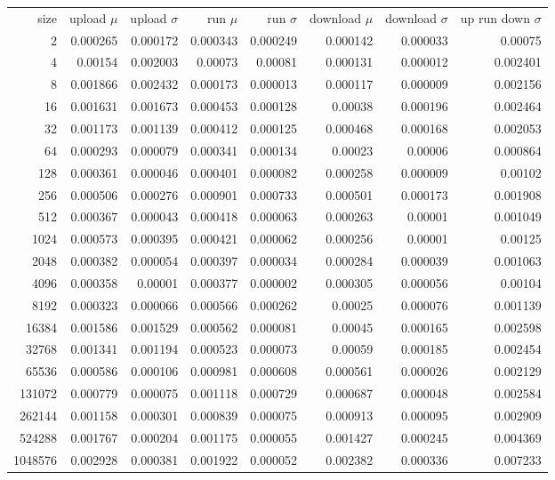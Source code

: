 \begin{tabular}{r r r r r r r r}
size & upload $\mu$  & upload $\sigma$ & run $\mu$ & run $\sigma$ & download $\mu$ & download $\sigma$ & up run down $\sigma$ \\
2 & 0.000265 & 0.000172 & 0.000343 & 0.000249 & 0.000142 & 0.000033 & 0.00075 \\
4 & 0.00154 & 0.002003 & 0.00073 & 0.00081 & 0.000131 & 0.000012 & 0.002401 \\
8 & 0.001866 & 0.002432 & 0.000173 & 0.000013 & 0.000117 & 0.000009 & 0.002156 \\
16 & 0.001631 & 0.001673 & 0.000453 & 0.000128 & 0.00038 & 0.000196 & 0.002464 \\
32 & 0.001173 & 0.001139 & 0.000412 & 0.000125 & 0.000468 & 0.000168 & 0.002053 \\
64 & 0.000293 & 0.000079 & 0.000341 & 0.000134 & 0.00023 & 0.00006 & 0.000864 \\
128 & 0.000361 & 0.000046 & 0.000401 & 0.000082 & 0.000258 & 0.000009 & 0.00102 \\
256 & 0.000506 & 0.000276 & 0.000901 & 0.000733 & 0.000501 & 0.000173 & 0.001908 \\
512 & 0.000367 & 0.000043 & 0.000418 & 0.000063 & 0.000263 & 0.00001 & 0.001049 \\
1024 & 0.000573 & 0.000395 & 0.000421 & 0.000062 & 0.000256 & 0.00001 & 0.00125 \\
2048 & 0.000382 & 0.000054 & 0.000397 & 0.000034 & 0.000284 & 0.000039 & 0.001063 \\
4096 & 0.000358 & 0.00001 & 0.000377 & 0.000002 & 0.000305 & 0.000056 & 0.00104 \\
8192 & 0.000323 & 0.000066 & 0.000566 & 0.000262 & 0.00025 & 0.000076 & 0.001139 \\
16384 & 0.001586 & 0.001529 & 0.000562 & 0.000081 & 0.00045 & 0.000165 & 0.002598 \\
32768 & 0.001341 & 0.001194 & 0.000523 & 0.000073 & 0.00059 & 0.000185 & 0.002454 \\
65536 & 0.000586 & 0.000106 & 0.000981 & 0.000608 & 0.000561 & 0.000026 & 0.002129 \\
131072 & 0.000779 & 0.000075 & 0.001118 & 0.000729 & 0.000687 & 0.000048 & 0.002584 \\
262144 & 0.001158 & 0.000301 & 0.000839 & 0.000075 & 0.000913 & 0.000095 & 0.002909 \\
524288 & 0.001767 & 0.000204 & 0.001175 & 0.000055 & 0.001427 & 0.000245 & 0.004369 \\
1048576 & 0.002928 & 0.000381 & 0.001922 & 0.000052 & 0.002382 & 0.000336 & 0.007233 \\

\end{tabular}
